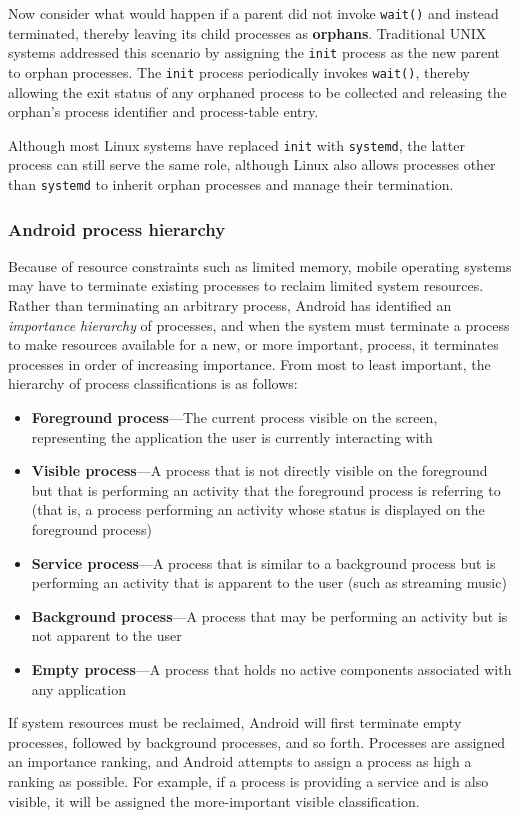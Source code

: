 Now consider what would happen if a parent did not invoke \texttt{wait()} and instead terminated, thereby leaving its child processes as \textbf{orphans}. Traditional UNIX systems addressed this scenario by assigning the \texttt{init} process as the new parent to orphan processes. The \texttt{init} process periodically invokes \texttt{wait()}, thereby allowing the exit status of any orphaned process to be collected and releasing the orphan's process identifier and process-table entry.

Although most Linux systems have replaced \texttt{init} with \texttt{systemd}, the latter process can still serve the same role, although Linux also allows processes other than \texttt{systemd} to inherit orphan processes and manage their termination.

\subsubsection*{Android process hierarchy}\label{sec:3.3:android_process_hierarchy}
Because of resource constraints such as limited memory, mobile operating systems may have to terminate existing processes to reclaim limited system resources. Rather than terminating an arbitrary process, Android has identified an \textit{importance hierarchy} of processes, and when the system must terminate a process to make resources available for a new, or more important, process, it terminates processes in order of increasing importance. From most to least important, the hierarchy of process classifications is as follows:
\begin{itemize}
    \item \textbf{Foreground process}---The current process visible on the screen, representing the application the user is currently interacting with
    \item \textbf{Visible process}---A process that is not directly visible on the foreground but that is performing an activity that the foreground process is referring to (that is, a process performing an activity whose status is displayed on the foreground process)
    \item \textbf{Service process}---A process that is similar to a background process but is performing an activity that is apparent to the user (such as streaming music)
    \item \textbf{Background process}---A process that may be performing an activity but is not apparent to the user
    \item \textbf{Empty process}---A process that holds no active components associated with any application
\end{itemize}
If system resources must be reclaimed, Android will first terminate empty processes, followed by background processes, and so forth. Processes are assigned an importance ranking, and Android attempts to assign a process as high a ranking as possible. For example, if a process is providing a service and is also visible, it will be assigned the more-important visible classification.

